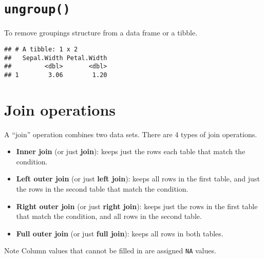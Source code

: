 \documentclass[]{article}
\newenvironment{Shaded}{\begin{snugshade}}{\end{snugshade}}
\newcommand{\DataTypeTok}[1]{\textcolor[rgb]{0.13,0.29,0.53}{#1}}
\newcommand{\KeywordTok}[1]{\textcolor[rgb]{0.13,0.29,0.53}{\textbf{#1}}}
\newcommand{\NormalTok}[1]{#1}
\newcommand{\OperatorTok}[1]{\textcolor[rgb]{0.81,0.36,0.00}{\textbf{#1}}}
\newcommand{\StringTok}[1]{\textcolor[rgb]{0.31,0.60,0.02}{#1}}
\providecommand{\tightlist}{%
  \setlength{\itemsep}{0pt}\setlength{\parskip}{0pt}}
\begin{document}
\hypertarget{ungroup}{%
\section{\texorpdfstring{\texttt{ungroup()}}{ungroup()}}\label{ungroup}}

To remove groupings structure from a data frame or a tibble.

\begin{Shaded}
\end{Shaded}

\begin{verbatim}
## # A tibble: 1 x 2
##   Sepal.Width Petal.Width
##         <dbl>       <dbl>
## 1        3.06        1.20
\end{verbatim}

\hypertarget{join-operations}{%
\section{Join operations}\label{join-operations}}

A ``join'' operation combines two data sets. There are 4 types of join
operations.

\begin{itemize}
\tightlist
\item
  \textbf{Inner join} (or just \textbf{join}): keeps just the rows each
  table that match the condition.
\item
  \textbf{Left outer join} (or just \textbf{left join}): keeps all rows
  in the first table, and just the rows in the second table that match
  the condition.
\item
  \textbf{Right outer join} (or just \textbf{right join}): keeps just
  the rows in the first table that match the condition, and all rows in
  the second table.
\item
  \textbf{Full outer join} (or just \textbf{full join}): keeps all rows
  in both tables.
\end{itemize}

Note Column values that cannot be filled in are assigned \texttt{NA}
values.
\end{document}
